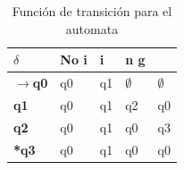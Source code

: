 \documentclass[spanish]{article}
\begin{document}
\begin{table}[H]
    \centering
        \begin{tabular}{|l |l |l |l |l}        
        \hline
        \textbf{$\delta$} & \textbf{No i} & \textbf{i} & \textbf{n} \textbf{g} \\
        \hline
        \textbf{$\rightarrow$q0} & q0 & q1 & $\emptyset$ & $\emptyset$ \\
        \hline
        \textbf{q1} & q0 & q1 & q2 & q0 \\    
        \hline
        \textbf{q2} & q0 & q1 & q0 & q3 \\
        \hline        
	\textbf{*q3} & q0 & q1 & q0 & q0 \\
        \hline        
        \end{tabular}
    \caption{Función de transición para el automata}

\end{table}
\end{document}
